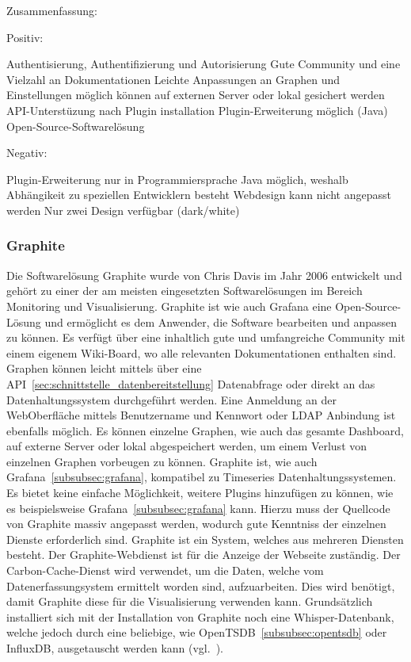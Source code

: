 Zusammenfassung:

Positiv:

\begin{outline}
  \1 Authentisierung, Authentifizierung und Autorisierung
  \1 Gute Community und eine Vielzahl an Dokumentationen
  \1 Leichte Anpassungen an Graphen und Einstellungen möglich
  \1  können auf externen Server oder lokal
  gesichert werden
  \1 \gls{API}\hyp{}Unterstüzung nach Plugin installation
  \1 Plugin\hyp{}Erweiterung möglich (Java)
  \1 Open\hyp{}Source\hyp{}Softwarelösung
\end{outline}

Negativ:

\begin{outline}
  \1 Plugin\hyp{}Erweiterung nur in Programmiersprache Java möglich, weshalb
  Abhängikeit zu speziellen Entwicklern besteht
  \1 Webdesign kann nicht angepasst werden
  \1 Nur zwei Design  verfügbar (dark/white)
\end{outline}
\mr%

\subsubsection{Graphite}
\label{subsubsec:graphite}
Die Softwarelösung Graphite wurde von Chris Davis im Jahr 2006 entwickelt und
gehört zu einer der am meisten eingesetzten Softwarelösungen im Bereich
Monitoring und Visualisierung. Graphite ist wie auch Grafana eine
Open\hyp{}Source\hyp{}Lösung und ermöglicht es dem Anwender, die Software
bearbeiten und anpassen zu können. Es verfügt über eine inhaltlich gute und
umfangreiche Community mit einem eigenem Wiki\hyp{}Board, wo alle relevanten
Dokumentationen enthalten sind. Graphen können leicht mittels
 über eine
\gls{API}~\ref{sec:schnittstelle_datenbereitstellung} Datenabfrage oder
direkt an das Datenhaltungssystem durchgeführt werden. Eine Anmeldung an der
WebOberfläche mittels Benutzername und Kennwort oder \gls{LDAP} Anbindung ist
ebenfalls möglich. Es können einzelne Graphen, wie auch das gesamte
\gls{Dashboard}, auf externe Server oder lokal abgespeichert werden, um einem
Verlust von einzelnen Graphen vorbeugen zu können. Graphite ist, wie auch
Grafana~\ref{subsubsec:grafana}, kompatibel zu Timeseries
Datenhaltungssystemen. Es bietet keine einfache Möglichkeit, weitere Plugins
hinzufügen zu können, wie es beispielsweise Grafana~\ref{subsubsec:grafana}
kann. Hierzu muss der Quellcode von Graphite massiv angepasst werden, wodurch
gute Kenntniss der einzelnen Dienste erforderlich sind. Graphite ist ein
System, welches aus mehreren Diensten besteht. Der Graphite\hyp{}Webdienst ist
für die Anzeige der Webseite zuständig. Der \gls{Carbon}\hyp{}Cache\hyp{}Dienst
wird verwendet, um die Daten, welche vom Datenerfassungsystem ermittelt worden
sind, aufzuarbeiten. Dies wird benötigt, damit Graphite diese für die
Visualisierung verwenden kann. Grundsätzlich installiert sich mit der
Installation von Graphite noch eine Whisper\hyp{}Datenbank, welche jedoch durch
eine beliebige, wie OpenTSDB~\ref{subsubsec:opentsdb} oder InfluxDB,
ausgetauscht werden kann (vgl.~\cite{graphite}).


